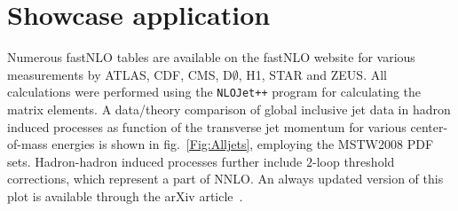 \documentclass{DISproc}
\begin{document}
%




\section{Showcase application}

Numerous fastNLO tables are available on the fastNLO website \cite{Fnlo:2012:Online} for various measurements by ATLAS, CDF, CMS, D$\emptyset$, H1, STAR and ZEUS.
All calculations were performed using the \texttt{NLOJet++} program \cite{Nagy:99,Nagy:01} for calculating the matrix elements.
A data/theory comparison of global inclusive jet data in hadron induced processes as function of the transverse jet momentum for various center-of-mass energies is shown in fig.~\ref{Fig:Alljets}, employing the MSTW2008 PDF sets. Hadron-hadron induced processes further include $2$-loop threshold corrections, which represent a part of NNLO. An always updated version of this plot is available through the arXiv article~\cite{Wobisch:2011ij}.
\end{document}
